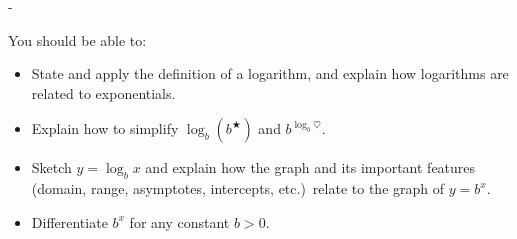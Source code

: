 \documentclass{article}
\makeatletter
\newlength{\tipmargin}
\renewenvironment{framed}{
  \setlength{\tipmargin}{\textwidth-\linewidth}
  \advance\@totalleftmargin-\tipmargin
  \def\FrameCommand{\hspace{\tipmargin}\fbox}%
  \advance\linewidth\tipmargin
  \MakeFramed {\advance\hsize-\width \FrameRestore}%
}
{\endMakeFramed}
\makeatother
\begin{document}

\begin{problemonly}
  \begin{framed}

You should be able to:
    \begin{itemize}[topsep=0pt,partopsep=0pt,parsep=8pt,itemsep=0pt]
    \item State and apply the definition of a logarithm, and explain how logarithms are related to exponentials.

    \item Explain how to simplify $\log_b \left( b^{\bigstar} \right)$ and $b^{\log_b \heartsuit}$.

    \item Sketch $y = \log_b x$ and explain how the graph and its important features (domain, range, asymptotes, intercepts, etc.)\ relate to the graph of $y = b^x$.

    \item Differentiate $b^x$ for any constant $b > 0$.

    \end{itemize}
  \end{framed}
\end{problemonly}
\end{document}
